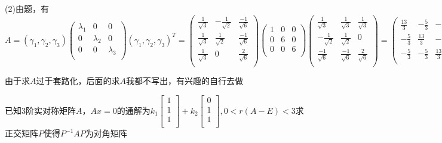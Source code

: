\documentclass[lang=cn,10pt]{elegantbook}
\begin{document}
\begin{solution}
	(2)由题，有
	\begin{equation*}
		A=(\gamma_{1},\gamma_{2},\gamma_{3})\left( \begin{matrix}
			\lambda _1&		0&		0\\
			0&		\lambda _2&		0\\
			0&		0&		\lambda _3\\
		\end{matrix} \right)(\gamma_{1},\gamma_{2},\gamma_{3})^{T}=\left( \begin{matrix}
		\frac{1}{\sqrt{3}}&		-\frac{1}{\sqrt{2}}&		\frac{-1}{\sqrt{6}}\\
		\frac{1}{\sqrt{3}}&		\frac{1}{\sqrt{2}}&		\frac{-1}{\sqrt{6}}\\
		\frac{1}{\sqrt{3}}&		0&		\frac{2}{\sqrt{6}}\\
		\end{matrix} \right)\left( \begin{matrix}
		1&		0&		0\\
		0&		6&		0\\
		0&		0&		6\\
		\end{matrix} \right)\left( \begin{matrix}
		\frac{1}{\sqrt{3}}&		\frac{1}{\sqrt{3}}&		\frac{1}{\sqrt{3}}\\
		-\frac{1}{\sqrt{2}}&		\frac{1}{\sqrt{2}}&		0\\
		\frac{-1}{\sqrt{6}}&		\frac{-1}{\sqrt{6}}&		\frac{2}{\sqrt{6}}\\
		\end{matrix} \right)=\left( \begin{matrix}
		\frac{13}{3}&		-\frac{5}{3}&		-\frac{5}{3}\\
		-\frac{5}{3}&		\frac{13}{3}&		-\frac{5}{3}\\
		-\frac{5}{3}&		-\frac{5}{3}&		\frac{13}{3}\\
		\end{matrix} \right) 
	\end{equation*}
\end{solution}
由于求$A$过于套路化，后面的求$A$我都不写出，有兴趣的自行去做
\begin{example}
	已知3阶实对称矩阵$A$，$Ax=0$的通解为$k_1\left[ \begin{array}{c}
		1\\
		1\\
		1\\
	\end{array} \right] +k_2\left[ \begin{array}{c}
		0\\
		1\\
		1\\
	\end{array} \right] ,0<r\left( A-E \right) <3$求正交矩阵$P$使得$P^{-1}AP$为对角矩阵
\end{example}
\end{document}

